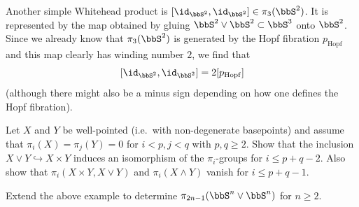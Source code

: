\begin{example}
    Another simple Whitehead product is $[\id_{\bbS^2},\id_{\bbS^2}]\in\pi_3(\bbS^2)$. It is represented by the map obtained by gluing $\bbS^2\vee \bbS^2\subset \bbS^3$ onto $\bbS^2$. Since we already know that $\pi_3(\bbS^2)$ is generated by the Hopf fibration $p_{\mathrm{Hopf}}$ and this map clearly has winding number $2$, we find that 
    \[[\id_{\bbS^2},\id_{\bbS^2}]=2[p_{\mathrm{Hopf}}]\]
    (although there might also be a minus sign depending on how one defines the Hopf fibration).
\end{example}

\begin{xca}
    Let $X$ and $Y$ be well-pointed (i.e.~with non-degenerate basepoints) and assume that $\pi_i(X)=\pi_j(Y)=0$ for $i<p,j<q$ with $p,q\geq 2$. Show that the inclusion $X\vee Y\hookrightarrow X\times Y$ induces an isomorphism of the $\pi_i$-groups for $i\leq p+q-2$. Also show that $\pi_i(X\times Y,X\vee Y)$ and $\pi_i(X\wedge Y)$ vanish for $i\leq p+q-1$.
\end{xca}

\begin{xca}
    Extend the above example to determine $\pi_{2n-1}(\bbS^n\vee \bbS^n)$ for $n\geq 2$.
\end{xca}

